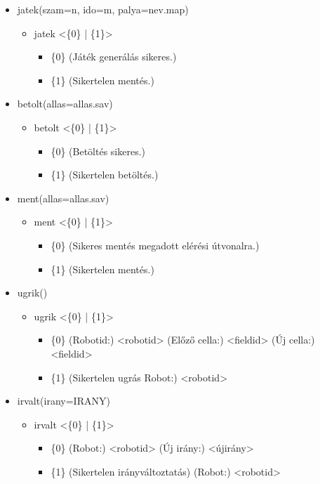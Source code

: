 \begin{itemize}
	\item jatek(szam=n, ido=m, palya=nev.map)
	\begin{itemize}
		\item jatek  <\{0\} | \{1\}>
		\begin{itemize}
			\item \{0\} (Játék generálás sikeres.)
			\item \{1\} (Sikertelen mentés.)
		\end{itemize}
	\end{itemize}	
	
	\item betolt(allas=allas.sav)
	\begin{itemize}
		\item betolt  <\{0\} | \{1\}>
		\begin{itemize}
			\item \{0\} (Betöltés sikeres.)
			\item \{1\} (Sikertelen betöltés.)
		\end{itemize}
	\end{itemize}
	
	\item ment(allas=allas.sav)
	\begin{itemize}
		\item ment  <\{0\} | \{1\}>
		\begin{itemize}
			\item \{0\} (Sikeres mentés megadott elérési útvonalra.)
			\item \{1\} (Sikertelen mentés.)
		\end{itemize}
	\end{itemize}		
	
	\item ugrik()
	\begin{itemize}
		\item ugrik  <\{0\} | \{1\}>
		\begin{itemize}
			\item \{0\} (Robotid:) <robotid> (Előző cella:) <fieldid> (Új cella:) <fieldid>
			\item \{1\} (Sikertelen ugrás Robot:) <robotid>
		\end{itemize}
	\end{itemize}	
	
	\item irvalt(irany=IRANY)
	\begin{itemize}
		\item irvalt  <\{0\} | \{1\}>
		\begin{itemize}
				\item \{0\} (Robot:) <robotid> (Új irány:) <újirány>
				\item \{1\} (Sikertelen irányváltoztatás) (Robot:) <robotid>
		\end{itemize}
	\end{itemize}
	

\end{itemize}
